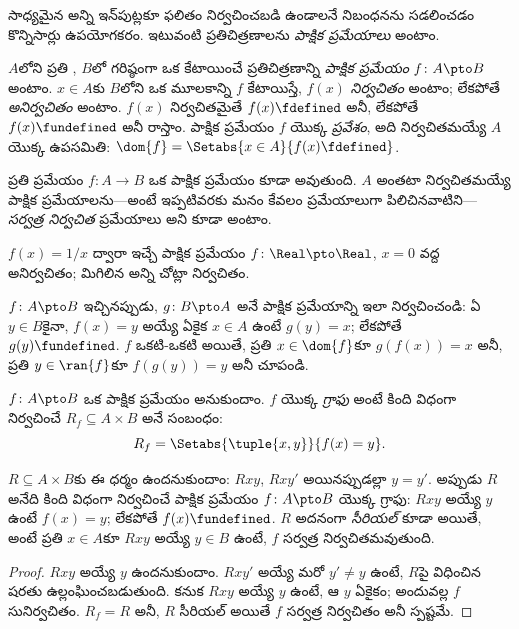 \documentclass[../../../include/open-logic-section]{subfiles}
\begin{document}


\begin{explain}
సాధ్యమైన అన్ని ఇన్‌పుట్లకూ ఫలితం నిర్వచించబడి ఉండాలనే నిబంధనను
సడలించడం కొన్నిసార్లు ఉపయోగకరం. ఇటువంటి ప్రతిచిత్రణాలను
\emph{పాక్షిక ప్రమేయాలు} అంటాం.
\end{explain}

\begin{defn}
$A$లోని ప్రతి , $B$లో గరిష్ఠంగా ఒక
 కేటాయించే ప్రతిచిత్రణాన్ని
\emph{పాక్షిక ప్రమేయం} $f \colon A \pto B$ అంటాం.
$x \in A$కు $B$లోని ఒక మూలకాన్ని $f$ కేటాయిస్తే, $f(x)$
\emph{నిర్వచితం} అంటాం; లేకపోతే \emph{అనిర్వచితం} అంటాం.
$f(x)$ నిర్వచితమైతే $f(x) \fdefined$ అనీ, లేకపోతే
$f(x) \fundefined$ అనీ రాస్తాం. పాక్షిక ప్రమేయం $f$ యొక్క
\emph{ప్రవేశం}, అది నిర్వచితమయ్యే $A$ యొక్క ఉపసమితి:
$\dom{f} = \Setabs{x \in A}{f(x) \fdefined}$.
\end{defn}

\begin{ex}
ప్రతి ప్రమేయం $f\colon A \to B$ ఒక పాక్షిక ప్రమేయం కూడా అవుతుంది.
$A$ అంతటా నిర్వచితమయ్యే పాక్షిక ప్రమేయాలను---అంటే ఇప్పటివరకు మనం
కేవలం ప్రమేయాలుగా పిలిచినవాటిని---\emph{సర్వత్ర నిర్వచిత}
ప్రమేయాలు అని కూడా అంటాం.
\end{ex}

\begin{ex}
$f(x) = 1/x$ ద్వారా ఇచ్చే పాక్షిక ప్రమేయం $f \colon \Real \pto \Real$,
$x = 0$ వద్ద అనిర్వచితం; మిగిలిన అన్ని చోట్లా నిర్వచితం.
\end{ex}

\begin{prob}
$f\colon A \pto B$ ఇచ్చినప్పుడు, $g\colon B \pto A$ అనే పాక్షిక
ప్రమేయాన్ని ఇలా నిర్వచించండి: ఏ $y \in B$కైనా, $f(x) = y$ అయ్యే
ఏకైక $x \in A$ ఉంటే $g(y) = x$; లేకపోతే $g(y) \fundefined$.
$f$ ఒకటి-ఒకటి అయితే, ప్రతి $x \in \dom{f}$కూ $g(f(x)) = x$ అనీ,
ప్రతి $y \in \ran{f}$కూ $f(g(y)) = y$ అనీ చూపండి.
\end{prob}

\begin{defn}[పాక్షిక ప్రమేయపు గ్రాఫు]
$f\colon A \pto B$ ఒక పాక్షిక ప్రమేయం అనుకుందాం.
$f$ యొక్క \emph{గ్రాఫు} అంటే కింది విధంగా నిర్వచించే
$R_f \subseteq A \times B$ అనే సంబంధం:
\[
R_f = \Setabs{\tuple{x,y}}{f(x) = y}.
\]
\end{defn}

\begin{prop}
$R \subseteq A \times B$కు ఈ ధర్మం ఉందనుకుందాం:
$Rxy$, $Rxy'$ అయినప్పుడల్లా $y = y'$.
అప్పుడు $R$ అనేది కింది విధంగా నిర్వచించే పాక్షిక ప్రమేయం
$f\colon A \pto B$ యొక్క గ్రాఫు: $Rxy$ అయ్యే $y$ ఉంటే $f(x) = y$;
లేకపోతే $f(x) \fundefined$. $R$ అదనంగా \emph{సీరియల్} కూడా అయితే,
అంటే ప్రతి $x \in A$కూ $Rxy$ అయ్యే $y \in B$ ఉంటే,
$f$ సర్వత్ర నిర్వచితమవుతుంది.
\end{prop}

\begin{proof}
$Rxy$ అయ్యే $y$ ఉందనుకుందాం. $Rxy'$ అయ్యే మరో $y' \neq y$ ఉంటే,
$R$పై విధించిన షరతు ఉల్లంఘించబడుతుంది. కనుక $Rxy$ అయ్యే $y$ ఉంటే,
ఆ $y$ ఏకైకం; అందువల్ల $f$ సునిర్వచితం.
$R_f = R$ అనీ, $R$ సీరియల్ అయితే $f$ సర్వత్ర నిర్వచితం అనీ స్పష్టమే.
\end{proof}
\end{document}
